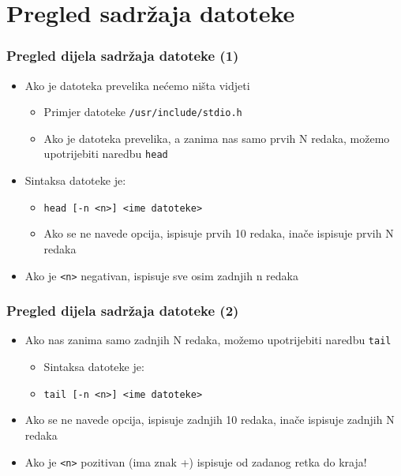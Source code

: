 \documentclass{beamer}
\newcommand{\shell}[1]{\texttt{\small #1}}
\begin{document}
\section{Pregled sadržaja datoteke}
\begin{frame}[t]
\frametitle{Pregled dijela sadržaja datoteke (1)}
\begin{itemize}
  \item Ako je datoteka prevelika nećemo ništa vidjeti
  \begin{itemize}
    \item Primjer datoteke \shell{/usr/include/stdio.h}
    \item Ako je datoteka prevelika, a zanima nas samo prvih N redaka,
          možemo upotrijebiti naredbu \shell{head}
  \end{itemize}
  \item Sintaksa datoteke je:
  \begin{itemize}
    \item[] \shell{head [-n <n>] <ime datoteke>}
    \item Ako se ne navede opcija, ispisuje prvih 10 redaka, inače ispisuje prvih N redaka
  \end{itemize}
  \item Ako je \shell{<n>} negativan, ispisuje sve osim zadnjih n redaka
\end{itemize}
\end{frame}

\begin{frame}[t]
\frametitle{Pregled dijela sadržaja datoteke (2)}
\begin{itemize}
  \item Ako nas zanima samo zadnjih N redaka, možemo upotrijebiti
        naredbu \shell{tail}
  \begin{itemize}
    \item Sintaksa datoteke je:
    \item[] \shell{tail [-n <n>] <ime datoteke>}
  \end{itemize}
  \item Ako se ne navede opcija, ispisuje zadnjih 10 redaka, inače ispisuje
        zadnjih N redaka
  \item Ako je \shell{<n>} pozitivan (ima znak +) ispisuje od zadanog
        retka do kraja!
\end{itemize}
\end{frame}
\end{document}
